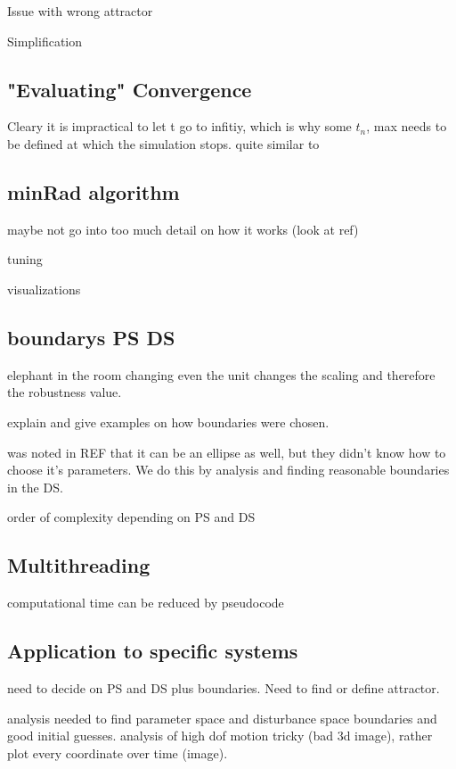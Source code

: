     Issue with wrong attractor

    Simplification


\subsection{"Evaluating" Convergence}
    Cleary it is impractical to let t go to infitiy, which is why some $t_n$, max needs to be defined at which the simulation stops. 
    quite similar to 

\subsection{minRad algorithm}

    maybe not go into too much detail on how it works (look at ref)

    tuning

    visualizations

\subsection{boundarys PS DS}

    

    elephant in the room 
    changing even the unit changes the scaling and therefore the robustness value.

    explain and give examples on how boundaries were chosen. 

    was noted in REF that it can be an ellipse as well, but they didn't know how to choose it's parameters. We do this by analysis and finding reasonable boundaries in the DS.

    order of complexity depending on PS and DS

\subsection{Multithreading}

    computational time can be reduced by 
    pseudocode

\subsection{Application to specific systems}
    

    need to decide on PS and DS plus boundaries. Need to find or define attractor. 

    analysis needed to find parameter space and disturbance space boundaries and good initial guesses.
    analysis of high dof motion tricky (bad 3d image), rather plot every coordinate over time (image). 

